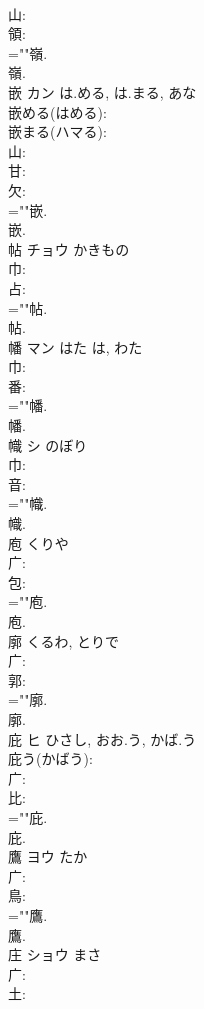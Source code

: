 \documentclass[8pt]{extreport}
\begin{document}
\begin{CJK}{UTF8}{min}
\\	山: 
\\	領: 
\\	=""嶺.
\\	嶺.
\\	嵌	カン	は.める, は.まる, あな		
\\	嵌める(はめる): 
\\	嵌まる(ハマる): 
\\	山: 
\\	甘: 
\\	欠: 
\\	=""嵌.
\\	嵌.
\\	帖	チョウ	かきもの		
\\	巾: 
\\	占: 
\\	=""帖.
\\	帖.
\\	幡	マン	はた	は, わた	
\\	巾: 
\\	番: 
\\	=""幡.
\\	幡.
\\	幟	シ	のぼり		
\\	巾: 
\\	音: 
\\	=""幟.
\\	幟.
\\	庖		くりや				
\\	广: 
\\	包: 
\\	=""庖.
\\	庖.
\\	廓		くるわ, とりで				
\\	广: 
\\	郭: 
\\	=""廓.
\\	廓.
\\	庇	ヒ	ひさし, おお.う, かば.う		
\\	庇う(かばう): 
\\	广: 
\\	比: 
\\	=""庇.
\\	庇.
\\	鷹	ヨウ	たか		
\\	广: 
\\	鳥: 
\\	=""鷹.
\\	鷹.
\\	庄	ショウ		まさ	
\\	广: 
\\	土: 

\end{CJK}
\end{document}
